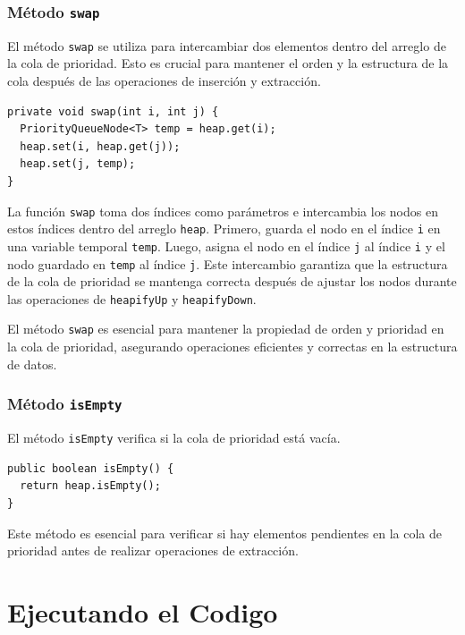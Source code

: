 \documentclass[10pt, a4paper]{article}
\newcommand{\mj}[1]{\texttt{#1}}
\begin{document}
\subsubsection{Método \mj{swap}}

El método \mj{swap} se utiliza para intercambiar dos elementos dentro del arreglo de la cola de prioridad. Esto es crucial para mantener el orden y la estructura de la cola después de las operaciones de inserción y extracción.

\begin{verbatim}
private void swap(int i, int j) {
  PriorityQueueNode<T> temp = heap.get(i);
  heap.set(i, heap.get(j));
  heap.set(j, temp);
}
\end{verbatim}

La función \mj{swap} toma dos índices como parámetros e intercambia los nodos en estos índices dentro del arreglo \mj{heap}. Primero, guarda el nodo en el índice \mj{i} en una variable temporal \mj{temp}. Luego, asigna el nodo en el índice \mj{j} al índice \mj{i} y el nodo guardado en \mj{temp} al índice \mj{j}. Este intercambio garantiza que la estructura de la cola de prioridad se mantenga correcta después de ajustar los nodos durante las operaciones de \mj{heapifyUp} y \mj{heapifyDown}.

El método \mj{swap} es esencial para mantener la propiedad de orden y prioridad en la cola de prioridad, asegurando operaciones eficientes y correctas en la estructura de datos.

\subsubsection{Método \mj{isEmpty}}

El método \mj{isEmpty} verifica si la cola de prioridad está vacía.

\begin{verbatim}
public boolean isEmpty() {
  return heap.isEmpty();
}
\end{verbatim}

Este método es esencial para verificar si hay elementos pendientes en la cola de prioridad antes de realizar operaciones de extracción.

\section{Ejecutando el Codigo}
\end{document}
